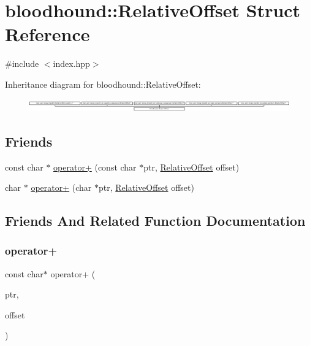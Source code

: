 \hypertarget{structbloodhound_1_1RelativeOffset}{}\section{bloodhound\+:\+:Relative\+Offset Struct Reference}
\label{structbloodhound_1_1RelativeOffset}


{\ttfamily \#include $<$index.\+hpp$>$}

Inheritance diagram for bloodhound\+:\+:Relative\+Offset\+:\begin{figure}[H]
\begin{center}
\leavevmode
\includegraphics[height=0.534606cm]{structbloodhound_1_1RelativeOffset}
\end{center}
\end{figure}
\subsection*{Friends}
\begin{DoxyCompactItemize}
\item 
const char $\ast$ \hyperlink{structbloodhound_1_1RelativeOffset_a878bac48143c1d3b2597273daca07f25}{operator+} (const char $\ast$ptr, \hyperlink{structbloodhound_1_1RelativeOffset}{Relative\+Offset} offset)
\item 
char $\ast$ \hyperlink{structbloodhound_1_1RelativeOffset_aef76589aeb04376cde5936475652ceda}{operator+} (char $\ast$ptr, \hyperlink{structbloodhound_1_1RelativeOffset}{Relative\+Offset} offset)
\end{DoxyCompactItemize}


\subsection{Friends And Related Function Documentation}
\mbox{\label{structbloodhound_1_1RelativeOffset_a878bac48143c1d3b2597273daca07f25}} 
\subsubsection{\texorpdfstring{operator+}{operator+}\hspace{0.1cm}{\footnotesize\ttfamily [1/2]}}
{\footnotesize\ttfamily const char$\ast$ operator+ (\begin{DoxyParamCaption}\item[{const char $\ast$}]{ptr,  }\item[{\hyperlink{structbloodhound_1_1RelativeOffset}{Relative\+Offset}}]{offset }\end{DoxyParamCaption})\hspace{0.3cm}{\ttfamily [friend]}}

